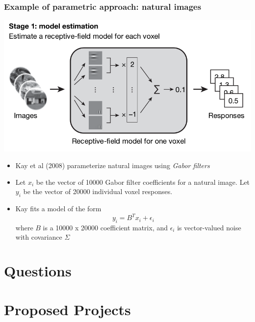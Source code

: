 \documentclass{beamer}
\begin{document}
\begin{frame}
\frametitle{Example of parametric approach: natural images}
\begin{center}
\includegraphics[scale = 0.2]{kay_stage1.png}
\end{center}
\begin{itemize}
\item Kay et al (2008) parameterize natural images using \emph{Gabor filters}
\item Let $x_i$ be the vector of 10000 Gabor filter coefficients for a natural image.
Let $y_i$ be the vector of 20000 individual voxel responses.
\item Kay fits a model of the form
\[
y_i = B^T x_i + \epsilon_i
\]
where $B$ is a 10000 x 20000 coefficient matrix, and $\epsilon_i$ is vector-valued noise with covariance $\Sigma$
\end{itemize}
\end{frame}

\section{Questions}

\section{Proposed Projects}
\end{document}

